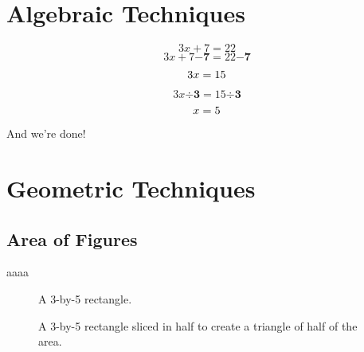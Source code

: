 \documentclass[openany]{book}
\begin{document}
\chapter{Algebraic Techniques}

\begin{example}\singlespacing\vspace{-0.5cm}
	\setcounter{equation}{0}
	\begin{equation}
		3x+7 = 22
	\end{equation}
	\begin{equation}
		3x+7\mathbf{-7} = 22\mathbf{-7} \tag{get rid of the $+7$}
	\end{equation}
	\begin{equation}\setcounter{equation}{3}
		3x = 15
	\end{equation}
	\begin{equation}
		3x\mathbf{\div 3} = 15\mathbf{\div 3} \tag{get rid of the $\times3$}
	\end{equation}
	\begin{equation}\setcounter{equation}{5}
		x = 5
	\end{equation}
	And we're done!
\end{example}


\chapter{Geometric Techniques}
\section{Area of Figures}
aaaa
\begin{figure}[htbp]
	\centering
	\caption{A 3-by-5 rectangle.}
\end{figure}

\begin{figure}[htbp]
	\centering
	\caption{A 3-by-5 rectangle sliced in half to create a triangle of half of the area.}
\end{figure}
\end{document}
